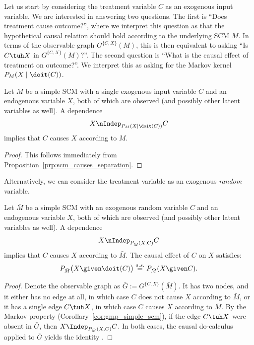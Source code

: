 Let us start by considering the treatment variable $C$ as an exogenous input variable. 
We are interested in answering two questions. The first is
``Does treatment cause outcome?'', where we interpret this question as that the 
hypothetical causal relation should hold according to the underlying SCM $M$. 
In terms of the observable graph $G^{\{C,X\}}(M)$,
this is then equivalent to asking ``Is $C \tuh X$ in $G^{\{C,X\}}(M)$?''.
The second question is ``What is the causal effect of treatment on outcome?''.
We interpret this as asking for the Markov kernel $P_{M}(X \mid \doit(C))$.
\begin{Prp}\label{prp:RCT1}
Let $M$ be a simple SCM with a single exogenous input variable $C$ and an 
endogenous variable $X$, both of which are observed (and possibly other latent variables as well).
A dependence 
  \begin{equation}\label{eq:RCT_CI_statement1}
    X \nIndep_{P_{M}(X\mid\doit(C))} C 
  \end{equation}
implies that $C$ causes $X$ according to $M$. 
\end{Prp}
\begin{proof}
This follows immediately from Proposition~\ref{prp:scm_causes_separation}.
\end{proof}

Alternatively, we can consider the treatment variable as an exogenous \emph{random} variable.
\begin{Prp}\label{prp:RCT2}
Let $\bar{M}$ be a simple SCM with an exogenous random variable $C$ and an endogenous 
variable $X$, both of which are observed (and possibly other latent variables as well).
A dependence 
  \begin{equation}\label{eq:RCT_CI_statement2}
    X \nIndep_{P_{\bar{M}}(X,C)} C 
  \end{equation}
implies that $C$ causes $X$ according to $\bar{M}$.
The causal effect of $C$ on $X$ satisfies:
  \begin{equation}\label{eq:RCT_causal_effect2}
    P_{\bar{M}}\big(X \given \doit(C)\big) \stackrel{a.s.}{=} P_{\bar{M}}(X \given C).
  \end{equation}
\end{Prp}
\begin{proof}
Denote the observable graph as $\bar{G} := G^{\{C,X\}}(\bar{M})$.
It has two nodes, and it either has no edge at all, in which case $C$ does not cause $X$ according to
$\bar{M}$, or it has a single edge $C \tuh X$, in which case $C$ causes $X$ according to $\bar{M}$.
By the Markov property (Corollary~\ref{cor:gmp_simple_scm}), if the edge $C \tuh X$ were absent in $\bar{G}$, 
then $X \Indep_{P_{\bar{M}}(X,C)} C$. 
In both cases, the causal do-calculus applied to $\bar{G}$ yields the identity . 
\end{proof}

